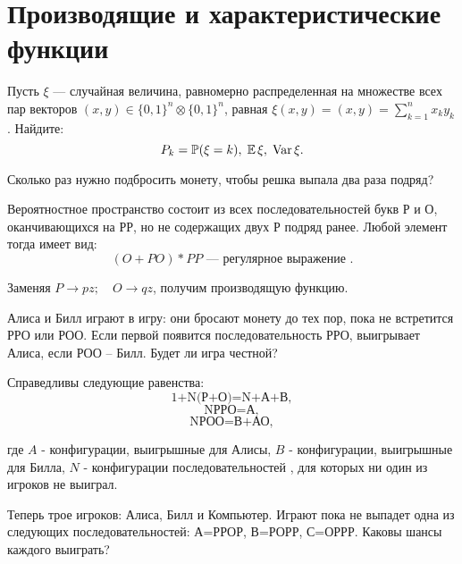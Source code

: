 \section{Производящие и характеристические функции}

\begin{problem}
Пусть $\xi$ --- случайная величина, равномерно распределенная на множестве всех пар векторов 
$(x,y)\in \{ 0,1\}^n\otimes \{ 0,1\}^n$, равная $\xi(x,y)=(x,y)=\sum\limits_{k=1}^{n} x_k y_k$. Найдите: 
$$
P_k={\mathbb P}(\xi=k), \; {\mathbb E}\,\xi, \; \mathop{\mathrm{Var}}\nolimits \xi . 
$$
\end{problem}

\begin{problem}
Сколько раз нужно подбросить монету, чтобы решка выпала два раза подряд?
\end{problem}

\begin{ordre}
Вероятностное пространство состоит из всех 
последовательностей букв Р и О, оканчивающихся на РР, но не содержащих двух 
Р подряд ранее. Любой элемент тогда имеет вид:
$$
(O+PO)*PP \text{ --- регулярное выражение }.
$$

Заменяя ${P}\to pz;\quad {O}\to qz$, получим производящую функцию.
\end{ordre}


\begin{problem}
Алиса и Билл играют в игру: они 
бросают монету до тех пор, пока не встретится РРО или РОО. Если первой 
появится последовательность РРО, выигрывает Алиса, если РОО -- Билл. Будет 
ли игра честной?
\end{problem}

\begin{ordre}

Справедливы следующие равенства:
\[
\mbox{1+N(Р+О)=N+А+В},
\]
\[
\mbox{NРРО=А},
\]
\[
\mbox{NРОО=В+АО},
\]

где $A$ - конфигурации, выигрышные для Алисы, $B$ -  конфигурации, выигрышные для Билла, $N$ - конфигурации последовательностей , для которых ни один из игроков не выиграл.

\end{ordre}


\begin{problem}
Теперь трое игроков: Алиса, Билл и Компьютер. Играют пока 
не выпадет одна из следующих последовательностей: А=РРОР, В=РОРР, С=ОРРР. 
Каковы шансы каждого выиграть?
\end{problem}


